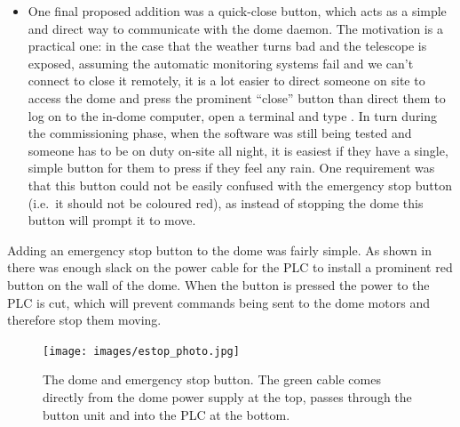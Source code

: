 \begin{colsection}
\begin{colsection}
\begin{itemize}
    \item One final proposed addition was a quick-close button, which acts as a simple and direct way to communicate with the dome daemon. The motivation is a practical one: in the case that the weather turns bad and the telescope is exposed, assuming the automatic monitoring systems fail and we can't connect to close it remotely, it is a lot easier to direct someone on site to access the dome and press the prominent ``close'' button than direct them to log on to the in-dome computer, open a terminal and type . In turn during the commissioning phase, when the software was still being tested and someone has to be on duty on-site all night, it is easiest if they have a single, simple button for them to press if they feel any rain. One requirement was that this button could not be easily confused with the emergency stop button (i.e.\ it should not be coloured red), as instead of stopping the dome this button will prompt it to move.
\end{itemize}
%
Adding an emergency stop button to the dome was fairly simple. As shown in  there was enough slack on the power cable for the PLC to install a prominent red button on the wall of the dome. When the button is pressed the power to the PLC is cut, which will prevent commands being sent to the dome motors and therefore stop them moving.

\begin{figure}[p]
    \begin{center}
        \texttt{[image: images/estop\_photo.jpg]}
    \end{center}
    \caption[The dome PLC and emergency stop button]{
        The dome  and emergency stop button. The green cable comes directly from the dome power supply at the top, passes through the button unit and into the PLC at the bottom.
    }\label{fig:estop_plc}
\end{figure}

\newpage


\end{colsection}
\end{colsection}
